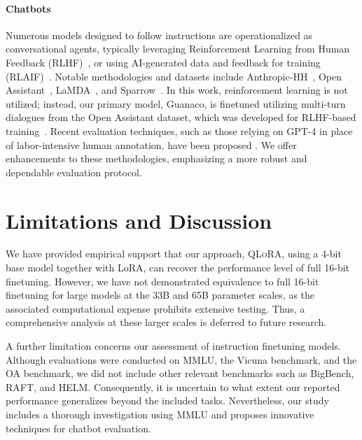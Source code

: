 \paragraph{Chatbots} Numerous models designed to follow instructions are operationalized as conversational agents, typically leveraging Reinforcement Learning from Human Feedback (RLHF)~\citep{christiano2017deep}, or using AI-generated data and feedback for training (RLAIF)~\citep{bai2022constitutional}. Notable methodologies and datasets include Anthropic-HH~\citep{askell2021general,bai2022training}, Open Assistant~\citep{kopf2023openassistant}, LaMDA~\citep{thoppilan2022lamda}, and Sparrow~\citep{glaese2022improving}. In this work, reinforcement learning is not utilized; instead, our primary model, Guanaco, is finetuned utilizing multi-turn dialogues from the Open Assistant dataset, which was developed for RLHF-based training~\citep{kopf2023openassistant}. Recent evaluation techniques, such as those relying on GPT-4 in place of labor-intensive human annotation, have been proposed \citep{vicuna2023,peng2023instruction}. We offer enhancements to these methodologies, emphasizing a more robust and dependable evaluation protocol.

\section{Limitations and Discussion}

We have provided empirical support that our approach, \textsc{QLoRA}, using a 4-bit base model together with LoRA, can recover the performance level of full 16-bit finetuning. However, we have not demonstrated equivalence to full 16-bit finetuning for large models at the 33B and 65B parameter scales, as the associated computational expense prohibits extensive testing. Thus, a comprehensive analysis at these larger scales is deferred to future research.

A further limitation concerns our assessment of instruction finetuning models. Although evaluations were conducted on MMLU, the Vicuna benchmark, and the OA benchmark, we did not include other relevant benchmarks such as BigBench, RAFT, and HELM. Consequently, it is uncertain to what extent our reported performance generalizes beyond the included tasks. Nevertheless, our study includes a thorough investigation using MMLU and proposes innovative techniques for chatbot evaluation.

